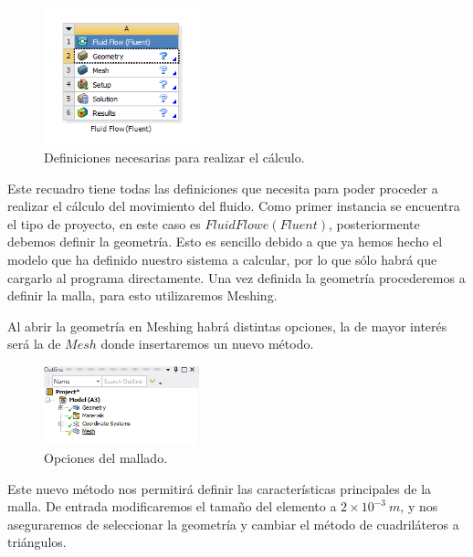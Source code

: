 \documentclass[12pt, letterpaper]{article}
\begin{document}
\begin{figure}[H]
	\centering
	\includegraphics[width=0.4\textwidth]{1.png}
	\caption{Definiciones necesarias para realizar el cálculo.}
\end{figure}

Este recuadro tiene todas las definiciones que necesita para poder proceder a realizar el cálculo del movimiento del fluido. Como primer instancia se encuentra el tipo de proyecto, en este caso es $Fluid Flowe (Fluent)$, posteriormente debemos definir la geometría. Esto es sencillo debido a que ya hemos hecho el modelo que ha definido nuestro sistema a calcular, por lo que sólo habrá que cargarlo al programa directamente. Una vez definida la geometría procederemos a definir la malla, para esto utilizaremos Meshing.

Al abrir la geometría en Meshing habrá distintas opciones, la de mayor interés será la de $Mesh$ donde insertaremos un nuevo método.


\begin{figure}[H]
	\centering
	\includegraphics[width=0.4\textwidth]{2.png}
	\caption{Opciones del mallado.}
\end{figure}

Este nuevo método nos permitirá definir las características principales de la malla. De entrada modificaremos el tamaño del elemento a $2 \times 10^{-3} \ m$, y nos aseguraremos de seleccionar la geometría y cambiar el método de cuadriláteros a triángulos.
\end{document}
